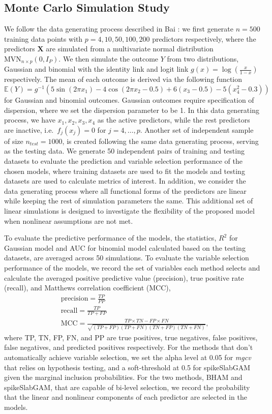 \documentclass[AMA,STIX1COL,]{WileyNJD-v2}
\begin{document}
\subsection{Monte Carlo Simulation Study}

We follow the data generating process described in Bai \citep{Bai2021}:
we first generate \(n=500\) training data points with
\(p=4, 10, 50, 100, 200\) predictors respectively, where the predictors
\(\boldsymbol{X}\) are simulated from a multivariate normal distribution
\(\text{MVN}_{n\times p}(0, I_{P})\). We then simulate the outcome \(Y\)
from two distributions, Gaussian and binomial with the identity link and
logit link \(g(x) = \log(\frac{x}{1-x})\) respectively. The mean of each
outcome is derived via the following function \[
\mathbb{E}(Y) = g^{-1}(5 \sin(2\pi x_1) - 4 \cos(2\pi x_2 -0.5) + 6(x_3-0.5) - 5(x_4^2 -0.3))
\] for Gaussian and binomial outcomes. Gaussian outcomes require
specification of dispersion, where we set the dispersion parameter to be
1. In this data generating process, we have \(x_1, x_2, x_3, x_4\) as
the active predictors, while the rest predictors are inactive,
i.e.~\(f_j(x_j) = 0\) for \(j = 4, \dots, p\). Another set of
independent sample of size \(n_{test}=1000\), is created following the
same data generating process, serving as the testing data. We generate
50 independent pairs of training and testing datasets to evaluate the
prediction and variable selection performance of the chosen models,
where training datasets are used to fit the models and testing datasets
are used to calculate metrics of interest. In addition, we consider the
data generating process where all functional forms of the predictors are
linear while keeping the rest of simulation parameters the same. This
additional set of linear simulations is designed to investigate the
flexibility of the proposed model when nonlinear assumptions are not
met.

To evaluate the predictive performance of the models, the statistics,
\(R^2\) for Gaussian model and AUC for binomial model calculated based
on the testing datasets, are averaged across 50 simulations. To evaluate
the variable selection performance of the models, we record the set of
variables each method selects and calculate the averaged positive
predictive value (precision), true positive rate (recall), and Matthews
correlation coefficient (MCC), \begin{align*}
&\text{precision} = \frac{TP}{PP}\\
&\text{recall} = \frac{TP}{TP+FP}\\
&\text{MCC} = \frac{TP\times TN - FP \times FN}{\sqrt{(TP+FP)(TP+FN)(TN+FP)(TN+FN)}},
\end{align*} where TP, TN, FP, FN, and PP are true positives, true
negatives, false positives, false negatives, and predicted positives
respectively. For the methods that don't automatically achieve variable
selection, we set the alpha level at 0.05 for \textit{mgcv} that relies
on hypothesis testing, and a soft-threshold at 0.5 for spikeSlabGAM
given the marginal inclusion probabilities. For the two methods, BHAM
and spikeSlabGAM, that are capable of bi-level selection, we record the
probability that the linear and nonlinear components of each predictor
are selected in the models.
\end{document}
